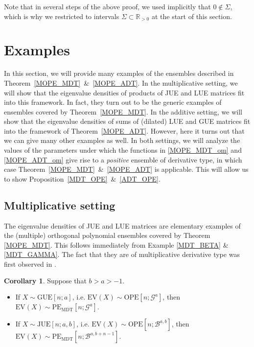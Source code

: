 \documentclass[a4paper,12pt,oneside]{article}
\theoremstyle{definition}
\newtheorem{cor}[defi]{Corollary}
\newcommand{\R}{\mathbb{R}}
\begin{document}
Note that in several steps of the above proof, we used implicitly that $0\not\in\Sigma$, which is why we restricted to intervals $\Sigma\subset\R_{>0}$ at the start of this section.


\section{Examples} \label{EX}

In this section, we will provide many examples of the ensembles described in Theorem~\ref{MOPE_MDT}~\&~\ref{MOPE_ADT}. In the multiplicative setting, we will show that the eigenvalue densities of products of JUE and LUE matrices fit into this framework. In fact, they turn out to be the generic examples of ensembles covered by Theorem~\ref{MOPE_MDT}. In the additive setting, we will show that the eigenvalue densities of sums of (dilated) LUE and GUE matrices fit into the framework of Theorem~\ref{MOPE_ADT}. However, here it turns out that we can give many other examples as well. In both settings, we will analyze the values of the parameters under which the functions in \eqref{MOPE_MDT_om} and \eqref{MOPE_ADT_om} give rise to a \textit{positive} ensemble of derivative type, in which case Theorem~\ref{MOPE_MDT}~\&~\ref{MOPE_ADT} is applicable. This will allow us to show  Proposition~\ref{MDT_OPE}~\&~\ref{ADT_OPE}.

\subsection{Multiplicative setting} \label{EX_M}

The eigenvalue densities of JUE and LUE matrices are elementary examples of the (multiple) orthogonal polynomial ensembles covered by Theorem \ref{MOPE_MDT}. This follows immediately from Example \ref{MDT_BETA} \& \ref{MDT_GAMMA}. The fact that they are of multiplicative derivative type was first observed in \cite[Ex. 2.4]{FKK:PolyaE}.

\begin{cor} \label{OPE_MDT_EX}
Suppose that $b>a>-1$.
\begin{itemize}
    \item[$i)$] If $X\sim\text{GUE}[n;a]$, i.e. $\text{EV}(X)\sim\text{OPE}[n;\mathcal{G}^a]$, then $\text{EV}(X)\sim\text{PE}_{\text{MDT}}[n;\mathcal{G}^a]$.
    \item[$ii)$] If $X\sim\text{JUE}[n;a,b]$, i.e. $\text{EV}(X)\sim\text{OPE}[n;\mathcal{B}^{a,b}]$, then $\text{EV}(X)\sim\text{PE}_{\text{MDT}}[n;\mathcal{B}^{a,b+n-1}]$.
\end{itemize}
\end{cor}
\end{document}
